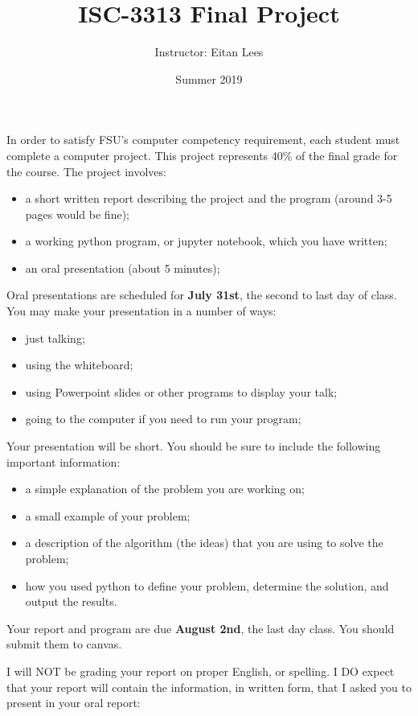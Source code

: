 \documentclass{article}
\title{ISC-3313 Final Project}
\author{Instructor: Eitan Lees}
\date{Summer 2019}
\begin{document}
\maketitle
In order to satisfy FSU's computer competency requirement, each student must complete a computer project. This project represents 40\% of the final grade for the course. The project involves:

\begin{itemize}
    \item  a short written report describing the project and the program (around 3-5 pages would be fine);
    \item a working python program, or jupyter notebook,  which you have written;
    \item an oral presentation (about 5 minutes);
\end{itemize}

Oral presentations are scheduled for \textbf{July 31st}, the second to last day of class. You may make your presentation in a number of ways:
\begin{itemize}
    \item just talking;
    \item using the whiteboard;
    \item using Powerpoint slides or other programs to display your talk;
    \item going to the computer if you need to run your program;
\end{itemize}

Your presentation will be short. You should be sure to include the following important information:

\begin{itemize}
    \item  a simple explanation of the problem you are working on;
    \item a small example of your problem;
    \item a description of the algorithm (the ideas) that you are using to solve the problem;
    \item how you used python to define your problem, determine the solution, and output the results.
\end{itemize}

Your report and program are due \textbf{August 2nd}, the last day class. You should submit them to canvas.

I will NOT be grading your report on proper English, or spelling. I DO expect that your report will contain the information, in written form, that I asked you to present in your oral report:
\end{document}
